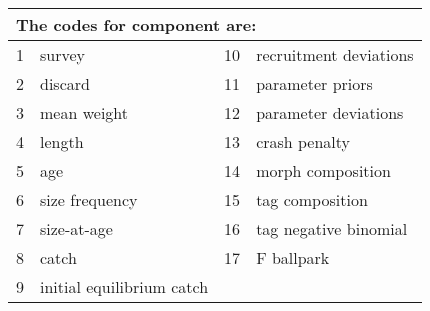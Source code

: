 \begin{center}
	\begin{longtable}{p{1cm} p{6cm} p{1cm} p{6cm} }
		\multicolumn{4}{l}{The codes for component are:}\\
		\hline
		1 & survey & 10 & recruitment deviations \\	
		2 & discard & 11 & parameter priors\\		
		3 &  mean weight & 12 & parameter deviations\\	
		4 & length & 13 & crash penalty\\		
		5 & age & 14 & morph composition\\
		6 & size frequency & 15 & tag composition\\		
		7 & size-at-age & 16 & tag negative binomial\\
		8 & catch & 17 & F ballpark\\		
		9 & initial equilibrium catch & & \\
		\hline
	\end{longtable}
\end{center}



%
%

